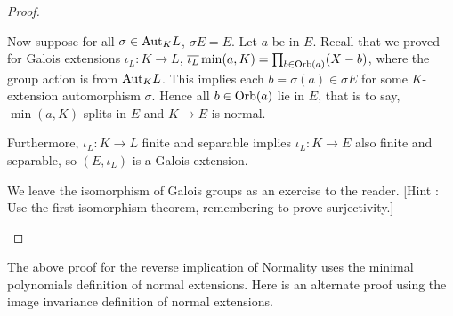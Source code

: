 \documentclass[../book.tex]{subfiles}
\begin{document}
\begin{proof}
\begin{enumerate}
        
        Now suppose for all $\sigma \in \mathrm{Aut}_{K}L$, $\sigma E = E$.
        Let $a$ be in $E$. 
        Recall that we proved for Galois extensions $\iota_L : K \to L$,
        $\overline{\iota_L} \min(a,K) = \prod_{b \in \mathrm{Orb}(a)} (X - b)$,
        where the group action is from $\mathrm{Aut}_{K}L$. 
        This implies each $b = \sigma(a) \in \sigma E$
        for some $K$-extension automorphism $\sigma$.
        Hence all $b \in \mathrm{Orb}(a)$ lie in $E$,
        that is to say, $\min(a,K)$ splits in $E$ and $K \to E$ is normal. 
        
        Furthermore, $\iota_L : K \to L$ finite and separable implies 
        $\iota_L : K \to E$ also finite and separable,
        so $(E,\iota_L)$ is a Galois extension. 
        
        We leave the isomorphism of Galois groups as an exercise to the reader. 
        [Hint : Use the first isomorphism theorem, remembering to prove surjectivity.]
\end{enumerate}
\end{proof}

The above proof for the reverse implication of Normality
uses the minimal polynomials definition of normal extensions.
Here is an alternate proof using 
the image invariance definition of normal extensions.
\end{document}
